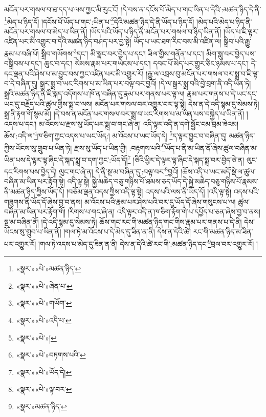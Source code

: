 མངོན་པར་གསལ་བ་ཐ་དད་པ་ལས་ཀྱང་མི་རུང་ངོ། །དེ་བས་ན་དངོས་པོ་མེད་པ་གང་ཡིན་པ་དེའི་:མཚན་ཉིད་དེ་ནི་\footnote{«སྣར་»«པེ་»མཚན་ཉིད་}མེད་པ་ཉིད་དོ། །དངོས་པོ་ཡོད་པ་གང་:ཡིན་པ་\footnote{«སྣར་»«པེ་»ཞེན་པ་}དེའི་མཚན་ཉིད་དེ་ནི་ཡོད་པ་ཉིད་དོ། །མེད་པའི་མེད་པ་ཉིད་ནི་མངོན་པར་གསལ་བ་མེད་པ་ཡིན་ནོ། །ཡོད་པའི་ཡོད་པ་ཉིད་ནི་མངོན་པར་གསལ་བ་ཉིད་ཡིན་ནོ། །ཡོད་པ་ཇི་ལྟར་འཛིན་པར་མི་འགྱུར་བ་དེའི་མཚན་ཉིད་བཤད་པར་བྱ་སྟེ། ཡོད་པ་ཡང་ཐག་རིང་བས་མི་འཛིན་ལ། སྒྲིབ་པའི་རྒྱུ་རྣམ་པ་བཞི་པོ། སྒྲིབ་གཡོགས་\footnote{«སྣར་»«པེ་»གཡོག་}དང་། མི་སྣང་བར་བྱེད་པ་དང་། ཟིལ་གྱིས་གནོན་པ་དང་། མིག་སླུ་བར་བྱེད་པས་བསྒྲིབས་པ་དང་། ཆུང་བ་དང་། སེམས་རྣམ་པར་གཡེངས་པ་དང་། དབང་པོ་མེད་པར་གྱུར་ཅིང་ཉམས་པ་དང་། དེ་དང་ལྡན་པའི་ཤེས་པ་མ་བྱུང་བས་ཀྱང་འཛིན་པར་མི་འགྱུར་རོ། །རྒྱུ་ལ་འབྲས་བུ་མངོན་པར་གསལ་བར་སྨྲ་བ་ཇི་ལྟ་བ་དེ་བཞིན་དུ། སྒྲར་སྨྲ་བ་ཡང་རིགས་པ་མ་ཡིན་པར་བལྟ་བར་བྱའོ། །དེ་ལ་སྒྲར་སྨྲ་བའི་བྱེ་བྲག་ནི་འདི་ཡིན་ཏེ། སྒྲའི་མཚན་ཉིད་ནི་ཇི་སྐད་འདོགས་པ་ཁོ་ན་བཞིན་དུ་རྣམ་པར་གནས་པར་ལྟ་ལ། རྣམ་པར་གནས་པ་དེ་ཡང་དང་ཡང་དུ་བརྗོད་པའི་ཚུལ་གྱིས་སྨྲ་བ་ལས། མངོན་པར་གསལ་བར་འགྱུར་བར་ལྟ་སྟེ། དེས་ན་དེ་འདི་སྙམ་དུ་སེམས་ཏེ། སྒྲ་ནི་རྟག་གོ་སྙམ་མོ། །དེ་བས་ན་མངོན་པར་གསལ་བར་སྨྲ་བ་ཡང་རིགས་པ་མ་ཡིན་པས་བསྐྱེད་པ་ཡིན་ནོ། །འདས་པ་དང་། མ་འོངས་པ་རྫས་སུ་ཡོད་པར་སྨྲ་བ་གང་ཞེ་ན། འདི་ལྟར་འདི་ན་དགེ་སྦྱོང་ངམ་བྲམ་ཟེའམ། ཆོས་:འདི་ལ་\footnote{«སྣར་»«པེ་»འདི་པ་}ཁ་ཅིག་ཀྱང་འདས་པ་ཡང་ཡོད:། མ་འོངས་པ་ཡང་ཡོད་དེ། \footnote{«སྣར་»«པེ་»།  }ད་ལྟར་བྱུང་བ་བཞིན་དུ། མཚན་ཉིད་ཀྱིས་ཡོངས་སུ་གྲུབ་པ་ཡིན་ཏེ། རྫས་སུ་ཡོད་པ་ཡིན་གྱི། :བརྟགས་པའི་\footnote{«སྣར་»«པེ་»བཏགས་པའི་}ཡོད་པ་ནི་མ་ཡིན་ནོ་ཞེས་ཚུལ་བཞིན་མ་ཡིན་པས་དེ་ལྟར་ལྟ་ཞིང་དེ་སྐད་སྨྲ་བ་དག་ཀྱང་:ཡོད་དོ།\footnote{«སྣར་»«པེ་»ཡོད་དེ།} །ཅིའི་ཕྱིར་དེ་ལྟར་ལྟ་ཞིང་དེ་སྐད་སྨྲ་བར་བྱེད་ཅེ་ན། ལུང་དང་རིགས་པས་བྱེད་དེ། ལུང་གང་ཞེ་ན། དེ་ནི་སྔ་མ་བཞིན་དུ་:བལྟ་བར་\footnote{«སྣར་»«པེ་»ལྟ་བར་}བྱའོ། །ཆོས་འདི་པ་ཡང་མདོ་སྡེ་ལ་ཚུལ་བཞིན་མ་ཡིན་པར་རྟོག་སྟེ། འདི་ལྟ་སྟེ། སྐྱེ་མཆེད་བཅུ་གཉིས་པོ་ཐམས་ཅད་ཡོད་དེ་སྐྱེ་མཆེད་བཅུ་གཉིས་པོ་རྣམས་ནི་མཚན་ཉིད་ཀྱིས་ཡོད་དོ། །བཅོམ་ལྡན་འདས་ཀྱིས་འདི་ལྟ་སྟེ། འདས་པའི་ལས་ནི་ཡོད་དོ། །འདི་ལྟ་སྟེ། འདས་པའི་གཟུགས་ནི་ཡོད་དོ་ཞེས་བྱ་བ་ནས། མ་འོངས་པའི་རྣམ་པར་ཤེས་པའི་བར་དུ་ཡོད་དོ་ཞེས་གསུངས་པ་ལ། ཚུལ་བཞིན་མ་ཡིན་པར་རྟོག་གོ། །རིགས་པ་གང་ཞེ་ན། འདི་ལྟར་འདི་ན་ཁ་ཅིག་རྟོག་གེ་པ་དཔྱོད་པ་ཅན་ཞེས་བྱ་བ་ནས། སྔ་མ་བཞིན་ནོ། །དེ་འདི་སྙམ་དུ་སེམས་ཏེ། ཆོས་གང་རང་གི་མཚན་ཉིད་གང་གིས་རྣམ་པར་གནས་པ་དེ་ནི། དེས་ཡོངས་སུ་གྲུབ་པ་ཡིན་ནོ། །གལ་ཏེ་མ་འོངས་པ་དེ་མེད་དུ་ཟིན་ན་ནི། དེས་ན་དེའི་ཚེ། རང་གི་མཚན་ཉིད་མ་ཟིན་པར་འགྱུར་རོ། །གལ་ཏེ་འདས་པ་མེད་དུ་ཟིན་ན་ནི། དེས་ན་དེའི་ཚེ་རང་གི་:མཚན་ཉིད་དང་\footnote{«སྣར་»མཚན་ཉིད་}བྲལ་བར་འགྱུར་རོ། །

